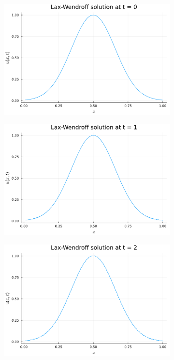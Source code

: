 \documentclass{article}
\begin{document}
\begin{figure}[H]
	\centering
	\begin{subfigure}{0.495\linewidth}
		\centering
		\includegraphics[width=\linewidth]{p3t0.pdf}
	\end{subfigure}
	\begin{subfigure}{0.495\linewidth}
		\centering
		\includegraphics[width=\linewidth]{p3t1.pdf}
	\end{subfigure}
	\begin{subfigure}{0.495\linewidth}
		\centering
		\includegraphics[width=\linewidth]{p3t2.pdf}

\end{subfigure}
\end{figure}
\end{document}
